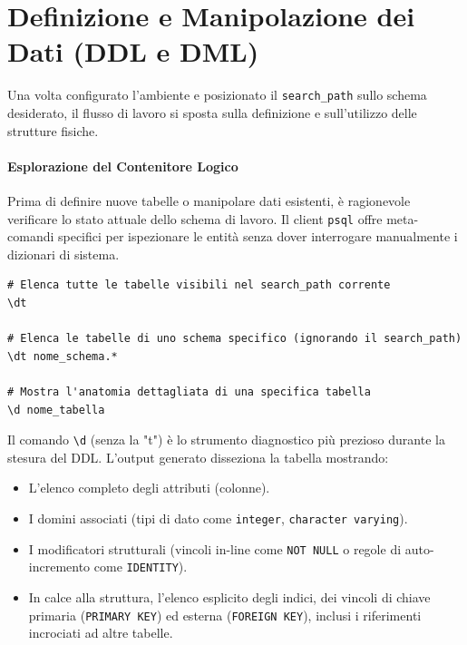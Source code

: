 \section{Definizione e Manipolazione dei Dati (DDL e DML)}

Una volta configurato l'ambiente e posizionato il \texttt{search\_path} sullo schema desiderato, il flusso di lavoro si sposta sulla definizione e sull'utilizzo delle strutture fisiche.

\paragraph{Esplorazione del Contenitore Logico}

Prima di definire nuove tabelle o manipolare dati esistenti, è ragionevole verificare lo stato attuale dello schema di lavoro. Il client \texttt{psql} offre meta-comandi specifici per ispezionare le entità senza dover interrogare manualmente i dizionari di sistema.

\begin{lstlisting}[language=TerminalBash, title=Meta-comandi di Ispezione delle Tabelle]
# Elenca tutte le tabelle visibili nel search_path corrente
\dt

# Elenca le tabelle di uno schema specifico (ignorando il search_path)
\dt nome_schema.*

# Mostra l'anatomia dettagliata di una specifica tabella
\d nome_tabella
\end{lstlisting}

\begin{dettagli}
Il comando \texttt{\textbackslash d} (senza la "t") è lo strumento diagnostico più prezioso durante la stesura del DDL. L'output generato disseziona la tabella mostrando:
\begin{itemize}
    \item L'elenco completo degli attributi (colonne).
    \item I domini associati (tipi di dato come \texttt{integer}, \texttt{character varying}).
    \item I modificatori strutturali (vincoli in-line come \texttt{NOT NULL} o regole di auto-incremento come \texttt{IDENTITY}).
    \item In calce alla struttura, l'elenco esplicito degli indici, dei vincoli di chiave primaria (\texttt{PRIMARY KEY}) ed esterna (\texttt{FOREIGN KEY}), inclusi i riferimenti incrociati ad altre tabelle.
\end{itemize}
\end{dettagli}

